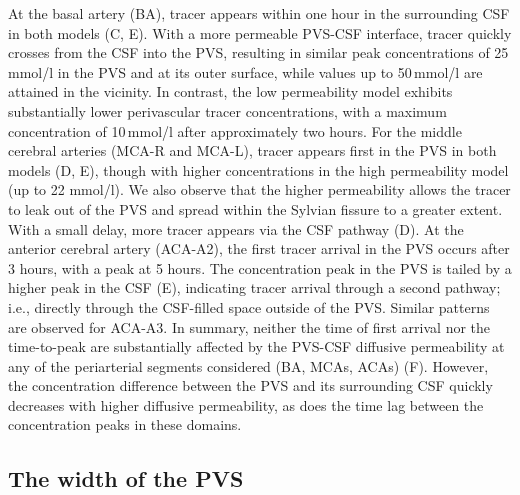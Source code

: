 \documentclass[fleqn,10pt]{wlscirep}
\begin{document}
At the basal artery (BA), tracer appears within one hour in the
surrounding CSF in both models (C,
E). With a more permeable PVS-CSF interface, tracer quickly crosses
from the CSF into the PVS, resulting in similar peak concentrations of
25\,mmol/l in the PVS and at its outer surface, while values up to
50\,mmol/l are attained in the vicinity. In contrast, the low
permeability model exhibits substantially lower perivascular tracer
concentrations, with a maximum concentration of 10\,mmol/l after
approximately two hours.
For the middle cerebral arteries (MCA-R and MCA-L), tracer appears
first in the PVS in both models (D, E),
though with higher concentrations in the high permeability model (up
to 22 mmol/l). We also observe that the higher permeability allows the
tracer to leak out of the PVS and spread within the Sylvian fissure to
a greater extent. With a small delay, more tracer appears via the CSF
pathway (D). At the anterior cerebral
artery (ACA-A2), the first tracer arrival in the PVS occurs after 3
hours, with a peak at 5 hours. The concentration peak in the PVS is
tailed by a higher peak in the CSF (E),
indicating tracer arrival through a second pathway; i.e., directly
through the CSF-filled space outside of the PVS. Similar patterns are
observed for ACA-A3.
%
In summary, neither the time of first arrival nor the time-to-peak are
substantially affected by the PVS-CSF diffusive permeability at any of
the periarterial segments considered (BA, MCAs, ACAs)
(F). However, the concentration
difference between the PVS and its surrounding CSF quickly decreases
with higher diffusive permeability, as does the time lag between the
concentration peaks in these domains.





  
\subsection*{The width of the PVS} 
\end{document}
